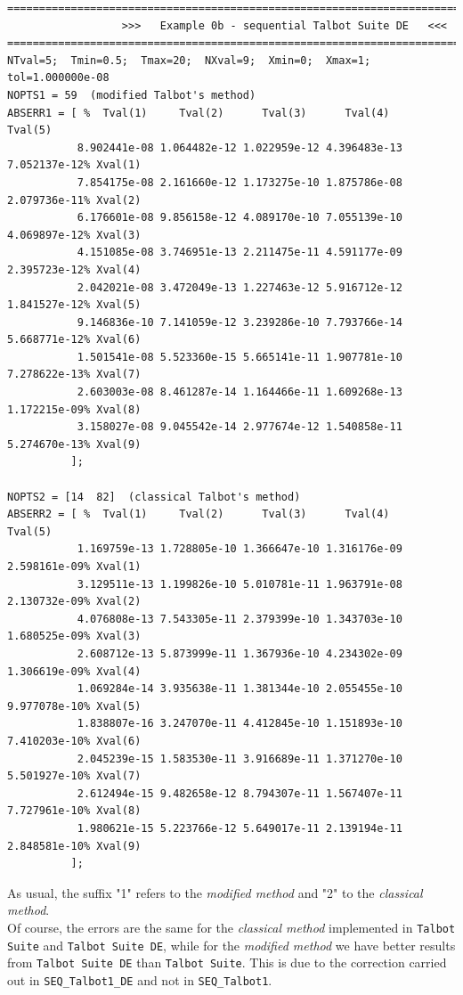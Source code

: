 \documentclass[a4paper,10pt]{report}%
\begin{document}
\begin{lstlisting}
====================================================================================
                  >>>   Example 0b - sequential Talbot Suite DE   <<<
====================================================================================
NTval=5;  Tmin=0.5;  Tmax=20;  NXval=9;  Xmin=0;  Xmax=1;  tol=1.000000e-08
NOPTS1 = 59  (modified Talbot's method)
ABSERR1 = [ %  Tval(1)     Tval(2)      Tval(3)      Tval(4)      Tval(5)
           8.902441e-08 1.064482e-12 1.022959e-12 4.396483e-13 7.052137e-12% Xval(1)
           7.854175e-08 2.161660e-12 1.173275e-10 1.875786e-08 2.079736e-11% Xval(2)
           6.176601e-08 9.856158e-12 4.089170e-10 7.055139e-10 4.069897e-12% Xval(3)
           4.151085e-08 3.746951e-13 2.211475e-11 4.591177e-09 2.395723e-12% Xval(4)
           2.042021e-08 3.472049e-13 1.227463e-12 5.916712e-12 1.841527e-12% Xval(5)
           9.146836e-10 7.141059e-12 3.239286e-10 7.793766e-14 5.668771e-12% Xval(6)
           1.501541e-08 5.523360e-15 5.665141e-11 1.907781e-10 7.278622e-13% Xval(7)
           2.603003e-08 8.461287e-14 1.164466e-11 1.609268e-13 1.172215e-09% Xval(8)
           3.158027e-08 9.045542e-14 2.977674e-12 1.540858e-11 5.274670e-13% Xval(9)
          ];

NOPTS2 = [14  82]  (classical Talbot's method)
ABSERR2 = [ %  Tval(1)     Tval(2)      Tval(3)      Tval(4)     Tval(5)
           1.169759e-13 1.728805e-10 1.366647e-10 1.316176e-09 2.598161e-09% Xval(1)
           3.129511e-13 1.199826e-10 5.010781e-11 1.963791e-08 2.130732e-09% Xval(2)
           4.076808e-13 7.543305e-11 2.379399e-10 1.343703e-10 1.680525e-09% Xval(3)
           2.608712e-13 5.873999e-11 1.367936e-10 4.234302e-09 1.306619e-09% Xval(4)
           1.069284e-14 3.935638e-11 1.381344e-10 2.055455e-10 9.977078e-10% Xval(5)
           1.838807e-16 3.247070e-11 4.412845e-10 1.151893e-10 7.410203e-10% Xval(6)
           2.045239e-15 1.583530e-11 3.916689e-11 1.371270e-10 5.501927e-10% Xval(7)
           2.612494e-15 9.482658e-12 8.794307e-11 1.567407e-11 7.727961e-10% Xval(8)
           1.980621e-15 5.223766e-12 5.649017e-11 2.139194e-11 2.848581e-10% Xval(9)
          ];
\end{lstlisting}
As usual, the suffix "1" refers to the {\em modified method} and "2" to the {\em classical method}.
\\
Of course, the errors are the same for the {\em classical method} implemented in {\tt Talbot Suite} and
{\tt Talbot Suite DE}, while for the {\em modified method} we have better results from {\tt Talbot Suite DE}
than {\tt Talbot Suite}.
This is due to the correction carried out in {\tt SEQ\_Talbot1\_DE} and not in {\tt SEQ\_Talbot1}.
\end{document}

